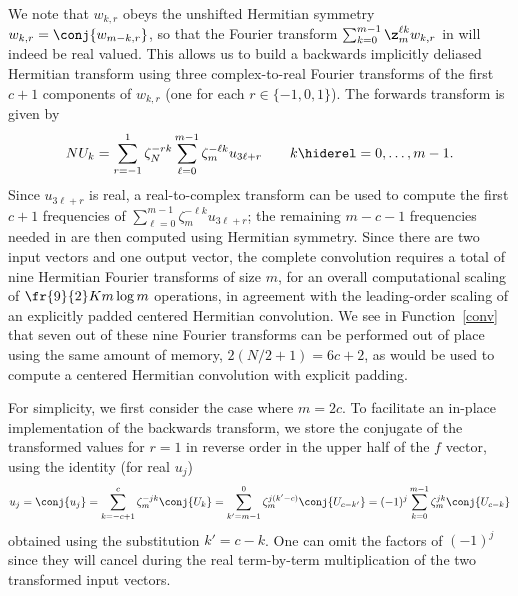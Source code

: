 \documentclass[final]{siamltex}
\def\belc{\begin{equation}}
\def\eelc{\end{equation}}
\def\no{\hiderel}
\begin{document}
We note that $w_{k,r}$ obeys the unshifted Hermitian symmetry 
$w_{k,r}=\conj{w_{m-k,r}}$, so that the Fourier transform
$\sum_{k=0}^{m-1}\z_m^{\ell k} w_{k,r}$ in  will indeed
be real valued. This allows us to build a backwards implicitly deliased
Hermitian transform using three complex-to-real Fourier transforms of the
first $c+1$ components of $w_{k,r}$ (one for each $r\in\{-1,0,1\}$). The
forwards transform is given by
\belc
NU_k
=\sum_{r=-1}^{1}\zeta_N^{-rk}\sum_{\ell=0}^{m-1}\zeta_m^{-\ell k} u_{3\ell+r}
\qquad k\no =0,\ldots,m-1.\label{fft0forwardsB}
\eelc
Since $u_{3\ell+r}$ is real, a real-to-complex transform can be used to
compute the first $c+1$ frequencies of
$\sum_{\ell=0}^{m-1}\zeta_m^{-\ell k} u_{3\ell+r}$; the remaining $m-c-1$
frequencies needed in  are then computed using Hermitian
symmetry. Since there are two input vectors and
one output vector, the complete convolution requires a total of nine
Hermitian Fourier transforms of size $m$, for an overall computational
scaling of $\fr{9}{2}K m \log m$ operations, in agreement with the
leading-order scaling of an explicitly padded centered Hermitian convolution.
We see in Function~\ref{conv} that seven out of these nine Fourier
transforms can be performed out of place using the same amount of memory,
$2(N/2+1)=6c+2$, as would be used to compute a centered Hermitian convolution with
explicit padding.

For simplicity, we first consider the case where $m=2c$.
To facilitate an in-place implementation of the backwards transform, we
store the conjugate of the transformed values for $r=1$ in reverse order in
the upper half of the $f$ vector, using the identity (for real $u_j$)
$$
u_j=\conj{u_j}=\sum_{k=-c+1}^{c}\zeta_m^{-jk} \conj{U_k}
=\sum_{k'=m-1}^{0}\zeta_m^{j(k'-c)} \conj{U_{c-k'}}
=(-1)^j\sum_{k=0}^{m-1}\zeta_m^{jk} \conj{U_{c-k}}
$$
obtained using the substitution $k'=c-k$. One can omit the factors of
$(-1)^j$ since they will cancel during the real term-by-term multiplication
of the two transformed input vectors.
\end{document}
